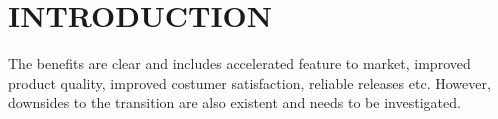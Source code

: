 \section{INTRODUCTION}
The benefits are clear and includes accelerated feature to market, improved product quality, improved costumer satisfaction, reliable releases etc. However, downsides to the transition are also existent and needs to be investigated.